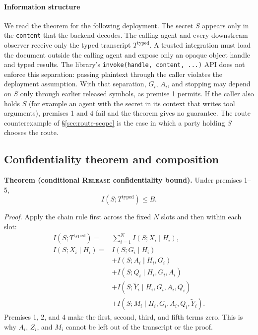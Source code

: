 \documentclass[conference,compsoc]{IEEEtran}
\newcommand{\rev}[1]{#1} %
\begin{document}
{\rev{\paragraph{Information structure} We read the theorem for the following deployment. The secret $S$ appears only in the \texttt{content} that the backend decodes. The calling agent and every downstream observer receive only the typed transcript $T^{\mathrm{typed}}$. A trusted integration must load the document outside the calling agent and expose only an opaque object handle and typed results. The library's \texttt{invoke(handle, content, ...)} API does not enforce this separation: passing plaintext through the caller violates the deployment assumption. With that separation, $G_i$, $A_i$, and stopping may depend on $S$ only through earlier released symbols, as premise 1 permits. If the caller also holds $S$ (for example an agent with the secret in its context that writes tool arguments), premises 1 and 4 fail and the theorem gives no guarantee. The route counterexample of \S\ref{sec:route-scope} is the case in which a party holding $S$ chooses the route.}

\subsection{Confidentiality theorem and composition}
\label{sec:confidentiality-theorem}
\label{app:proof}
\textbf{Theorem (conditional \textsc{Release} confidentiality bound).} Under premises 1--5,
\[
 I(S;T^{\mathrm{typed}})\le B.
\]

\emph{Proof.} Apply the chain rule first across the fixed $N$ slots and then
within each slot:
\begin{align*}
I(S;T^{\mathrm{typed}})
={}&\sum_{i=1}^{N} I(S;X_i\mid H_i),\\
I(S;X_i\mid H_i)
={}&I(S;G_i\mid H_i)\\
&+I(S;A_i\mid H_i,G_i)\\
&+I(S;Q_i\mid H_i,G_i,A_i)\\
&+I(S;\widetilde Y_i\mid H_i,G_i,A_i,Q_i)\\
&+I(S;M_i\mid H_i,G_i,A_i,Q_i,\widetilde Y_i).
\end{align*}
Premises 1, 2, and 4 make the first, second, third, and fifth terms zero.
This is why $A_i$, $Z_i$, and $M_i$ cannot be left out of the transcript or
the proof.

}
\end{document}

